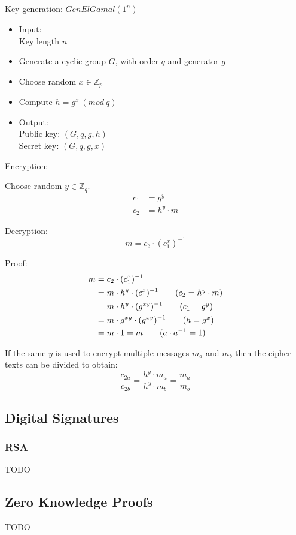 \documentclass[a4paper]{article}
\begin{document}
Key generation: $GenElGamal(1^{n})$
\begin{itemize}
  \item
    Input: \\
    Key length $n$
  \item Generate a cyclic group $G$, with order $q$ and generator $g$
  \item Choose random $x \in \mathbb{Z}_{p}$
  \item Compute $h = g^{x} \: (mod \: q)$
  \item
    Output: \\
    Public key: $(G, q, g, h)$ \\
    Secret key: $(G, q, g, x)$
\end{itemize}

Encryption:

Choose random $y \in \mathbb{Z}_{q}$.
\begin{align*}
  c_{1} &= g^{y} \\
  c_{2} &= h^{y} \cdot m
\end{align*}

Decryption:
\[
  m = c_{2} \cdot (c_{1}^{x})^{-1}
\]

Proof:
\begin{align*}
  m &= c_{2} \cdot (c_{1}^{x})^{-1} \\
    &= m \cdot h^{y} \cdot (c_{1}^{x})^{-1}   \tag*{($c_{2} = h^{y} \cdot m$)} \\
    &= m \cdot h^{y} \cdot (g^{xy})^{-1}      \tag*{($c_{1} = g^{y})$} \\
    &= m \cdot g^{xy} \cdot (g^{xy})^{-1}     \tag*{($h = g^{x}$)} \\
    &= m \cdot 1 = m                          \tag*{($a \cdot a^{-1} = 1$)}
\end{align*}


If the same $y$ is used to encrypt multiple messages $m_{a}$ and $m_{b}$ then
the cipher texts can be divided to obtain:
\[
  \frac{c_{2a}}{c_{2b}} = \frac{h^{y} \cdot m_{a}}{h^{y} \cdot m_{b}}
                        = \frac{m_{a}}{m_{b}}
\]

\subsection{Digital Signatures}

\subsubsection{RSA}

TODO

\subsection{Zero Knowledge Proofs}

TODO
\end{document}
